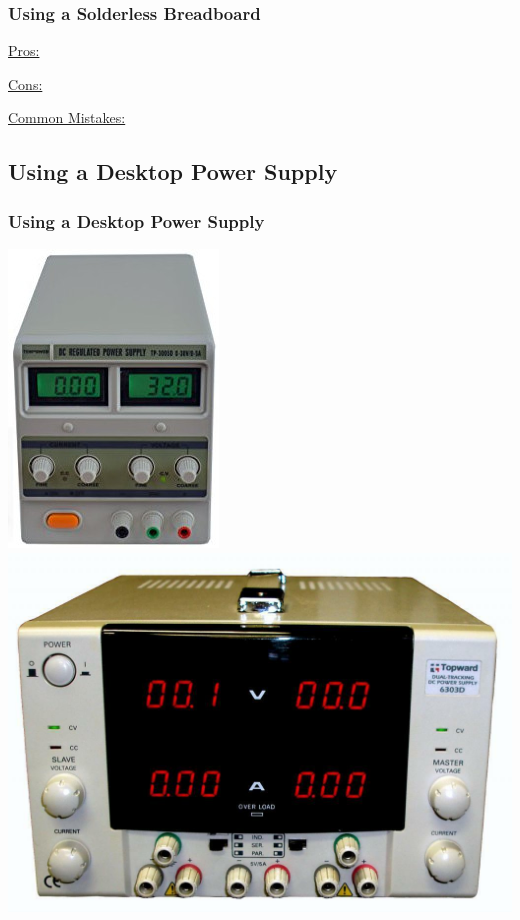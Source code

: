 \documentclass[fleqn]{beamer} %
\newcommand{\sectionIIsubsectionIItitle}{Using a Solderless Breadboard}
\newcommand{\sectionIIsubsectionIIItitle}{Using a Desktop Power Supply}
\begin{document}
\begin{frame}
			\end{frame}

			\begin{frame}
				\frametitle{\sectionIIsubsectionIItitle}

				 \begin{multicols}{2}
					 \underline{Pros:}
					 
					 \underline{Cons:}
					 
				 \end{multicols}
				 \vspace{30mm}
				 
				 \underline{Common Mistakes:}
				 \vspace{10mm}
			
			\end{frame}



		\subsection{\sectionIIsubsectionIIItitle}\label{sectionIIsubsectionIII}

			\begin{frame}
				\frametitle{\sectionIIsubsectionIIItitle}

				\includegraphics[scale=1.7]{images/lab_psu_cropped.jpg} 
				\hspace{5mm} \includegraphics[scale=.17]{images/topward.jpg}

			\end{frame}
\end{document}
